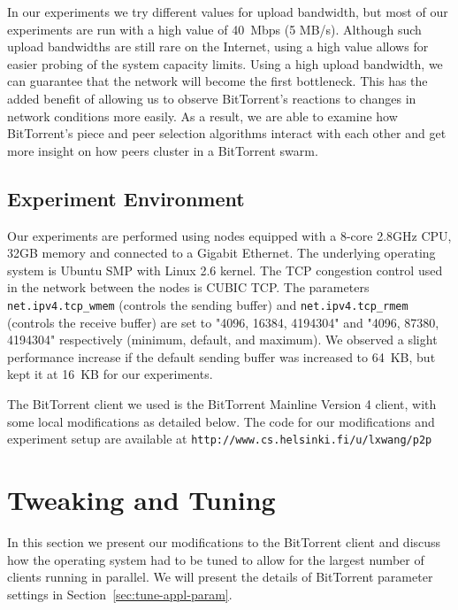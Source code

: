 \documentclass[10pt,letterpaper,twocolumn]{article}
\begin{document}
In our experiments we try different values for upload bandwidth, but
most of our experiments are run with a high value of 40~Mbps (5
MB/s). Although such upload bandwidths are still rare on the Internet,
using a high value allows for easier probing of the system capacity
limits. Using a high upload bandwidth, we can guarantee that the
network will become the first bottleneck. This has the added benefit
of allowing us to observe BitTorrent's reactions to changes in network
conditions more easily. As a result, we are able to examine how
BitTorrent's piece and peer selection algorithms interact with each
other and get more insight on how peers cluster in a BitTorrent swarm.










\subsection{Experiment Environment}

Our experiments are performed using nodes equipped with a 8-core
2.8GHz CPU, 32GB memory and connected to a Gigabit Ethernet. The
underlying operating system is Ubuntu SMP with Linux 2.6 kernel. The
TCP congestion control used in the network between the nodes is CUBIC
TCP. The parameters \texttt{net.ipv4.tcp\_wmem} (controls the sending
buffer) and \texttt{net.ipv4.tcp\_rmem} (controls the receive buffer)
are set to "4096, 16384, 4194304" and "4096, 87380, 4194304"
respectively (minimum, default, and maximum). We observed a slight
performance increase if the default sending buffer was increased to
64~KB, but kept it at 16~KB for our experiments.







The BitTorrent client we used is the BitTorrent Mainline Version 4
client, with some local modifications as detailed below. The code for
our modifications and experiment setup are available at
\texttt{http://www.cs.helsinki.fi/u/lxwang/p2p}






\section{Tweaking and Tuning}
\label{practical_issue}

In this section we present our modifications to the BitTorrent client
and discuss how the operating system had to be tuned to allow for the
largest number of clients running in parallel. We will present the
details of BitTorrent parameter settings in
Section~\ref{sec:tune-appl-param}. 
\end{document}
